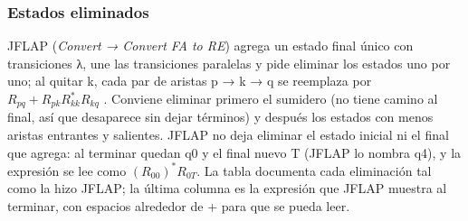 \hypertarget{estados-eliminados}{%
\subsubsection{Estados eliminados}\label{estados-eliminados}}

JFLAP (\emph{Convert → Convert FA to RE}) agrega un estado final único con transiciones λ, une las transiciones paralelas y pide eliminar los estados uno por uno; al quitar k, cada par de aristas p → k → q se reemplaza por \(R_{pq} + R_{pk} R_{kk}^* R_{kq}\) \autocite[cap. 3]{rodger2006}. Conviene eliminar primero el sumidero (no tiene camino al final, así que desaparece sin dejar términos) y después los estados con menos aristas entrantes y salientes. JFLAP no deja eliminar el estado inicial ni el final que agrega: al terminar quedan q0 y el final nuevo T (JFLAP lo nombra q4), y la expresión se lee como \((R_{00})^* R_{0T}\). La tabla documenta cada eliminación tal como la hizo JFLAP; la última columna es la expresión que JFLAP muestra al terminar, con espacios alrededor de + para que se pueda leer.

